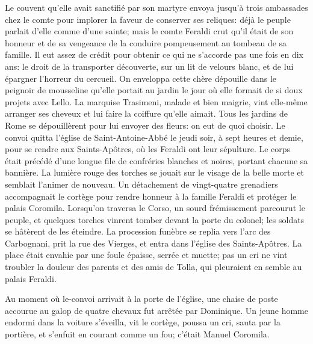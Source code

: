 Le couvent qu'elle avait sanctifié par son martyre envoya jusqu'à trois ambassades chez le comte pour implorer la faveur de conserver ses reliques: déjà le peuple parlait d'elle comme d'une sainte; mais le comte Feraldi crut qu'il était de son honneur et de sa vengeance de la conduire pompeusement au tombeau de sa famille. Il eut assez de crédit pour obtenir ce qui ne s'accorde pas une fois en dix ans: le droit de la transporter découverte, sur un lit de velours blanc, et de lui épargner l'horreur du cercueil. On enveloppa cette chère dépouille dans le peignoir de mousseline qu'elle portait au jardin le jour où elle formait de si doux projets avec Lello. La marquise Trasimeni, malade et bien maigrie, vint elle-même arranger ses cheveux et lui faire la coiffure qu'elle aimait. Tous les jardins de Rome se dépouillèrent pour lui envoyer des fleurs: on eut de quoi choisir. Le convoi quitta l'église de Saint-Antoine-Abbé le jeudi soir, à sept heures et demie, pour se rendre aux Saints-Apôtres, où les Feraldi ont leur sépulture. Le corps était précédé d'une longue file de confréries blanches et noires, portant chacune sa bannière. La lumière rouge des torches se jouait sur le visage de la belle morte et semblait l'animer de nouveau. Un détachement de vingt-quatre grenadiers accompagnait le cortège pour rendre honneur à la famille Feraldi et protéger le palais Coromila. Lorsqu'on traversa le Corso, un sourd frémissement parcourut le peuple, et quelques torches vinrent tomber devant la porte du colonel; les soldats se hâtèrent de les éteindre. La procession funèbre se replia vers l'arc des Carbognani, prit la rue des Vierges, et entra dans l'église des Saints-Apôtres. La place était envahie par une foule épaisse, serrée et muette; pas un cri ne vint troubler la douleur des parents et des amis de Tolla, qui pleuraient en semble au palais Feraldi.

Au moment où le-convoi arrivait à la porte de l'église, une chaise de poste accourue au galop de quatre chevaux fut arrêtée par Dominique. Un jeune homme endormi dans la voiture s'éveilla, vit le cortège, poussa un cri, sauta par la portière, et s'enfuit en courant comme un fou; c'était Manuel Coromila.

